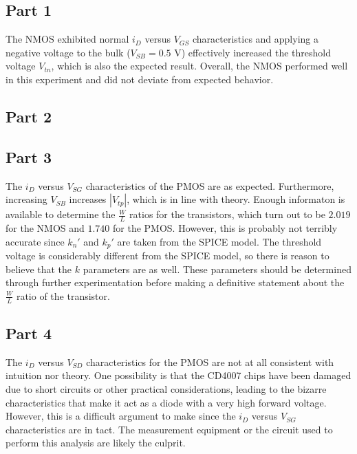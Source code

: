 \subsection{Part 1}
The NMOS exhibited normal $i_D$ versus $V_{GS}$ characteristics and applying a negative voltage to the bulk ($V_{SB} = 0.5$ \si{\volt}) effectively increased the threshold voltage $V_{tn}$, which is also the expected result. 
Overall, the NMOS performed well in this experiment and did not deviate from expected behavior.
\subsection{Part 2}
\subsection{Part 3}
The $i_{D}$ versus $V_{SG}$ characteristics of the PMOS are as expected.
Furthermore, increasing $V_{SB}$ increases $|V_{tp}|$, which is in line with theory.
Enough informaton is available to determine the $\frac{W}{L}$ ratios for the transistors, which turn out to be $2.019$ for the NMOS and $1.740$ for the PMOS.
However, this is probably not terribly accurate since $k_{n}'$ and $k_{p}'$ are taken from the SPICE model.
The threshold voltage is considerably different from the SPICE model, so there is reason to believe that the $k$ parameters are as well.
These parameters should be determined through further experimentation before making a definitive statement about the $\frac{W}{L}$ ratio of the transistor.
\subsection{Part 4}
The $i_{D}$ versus $V_{SD}$ characteristics for the PMOS are not at all consistent with intuition nor theory.
One possibility is that the CD4007 chips have been damaged due to short circuits or other practical considerations, leading to the bizarre characteristics that make it act as a diode with a very high forward voltage.
However, this is a difficult argument to make since the $i_{D}$ versus $V_{SG}$ characteristics are in tact.
The measurement equipment or the circuit used to perform this analysis are likely the culprit.
